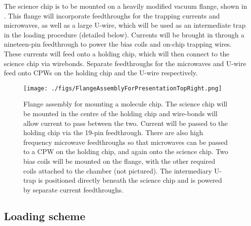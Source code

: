

The science chip is to be mounted on a heavily modified vacuum flange, shown in
. This flange will incorporate feedthroughs for
the trapping currents and microwaves, as well as a large U-wire, which will be
used as an intermediate trap in the loading procedure (detailed below). Currents
will be brought in through a nineteen-pin feedthrough  to power the bias coils
and on-chip trapping wires. These currents will feed onto a holding chip, which
will then connect to the science chip via wirebonds. Separate feedthroughs for
the microwaves and U-wire  feed onto CPWs on the
holding chip and the U-wire respectively.

\begin{figure}[ht]
  \texttt{[image: ./figs/FlangeAssemblyForPresentationTopRight.png]}
  \caption{
    Flange assembly for mounting a molecule chip. The science chip will be
    mounted in the centre of the holding chip and wire-bonds will allow current
    to pass between the two. Current will be passed to the holding chip via the
    19-pin feedthrough. There are also high frequency microwave feedthroughs so
    that microwaves can be passed to a CPW on the holding chip, and again onto
    the science chip. Two bias coils will be mounted on the flange, with the
    other required coils attached to the chamber (not pictured). The
    intermediary U-trap is positioned directly beneath the science chip and is
    powered by separate current feedthroughs. 
  }
  \label{experiment:fig:flange}
\end{figure}


\subsection{Loading scheme}
\label{experiment:loading}

